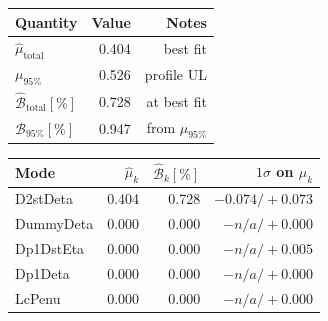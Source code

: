 \begin{tabular}{lrr}
\hline
Quantity & Value & Notes \\
\hline
$\hat{\mu}_{\mathrm{total}}$ & 0.404 & best fit \\
$\mu_{95\%}$ & 0.526 & profile UL \\
$\hat{\mathcal{B}}_{\mathrm{total}}[\%]$ & 0.728 & at best fit \\
$\mathcal{B}_{95\%}[\%]$ & 0.947 & from $\mu_{95\%}$ \\
\hline
\end{tabular}

\vspace{0.5em}

\begin{tabular}{lrrr}
\hline
Mode & $\hat{\mu}_k$ & $\hat{\mathcal{B}}_k[\%]$ & $1\sigma$ on $\mu_k$ \\
\hline
D2stDeta & 0.404 & 0.728 & $-0.074/+0.073$ \\
DummyDeta & 0.000 & 0.000 & $-n/a/+0.000$ \\
Dp1DstEta & 0.000 & 0.000 & $-n/a/+0.005$ \\
Dp1Deta & 0.000 & 0.000 & $-n/a/+0.000$ \\
LcPenu & 0.000 & 0.000 & $-n/a/+0.000$ \\
\hline
\end{tabular}
